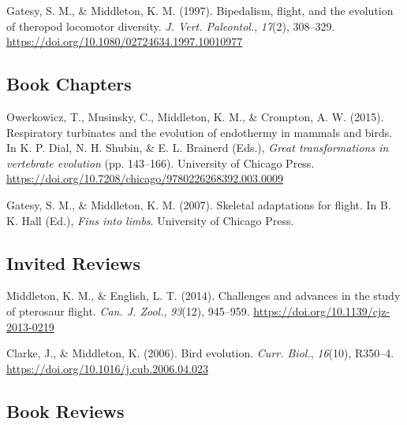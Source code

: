 \documentclass[11pt, a4paper]{awesome-cv}
\begin{document}
\leavevmode\hypertarget{ref-gatesy_bipedalism_1997}{}%
Gatesy, S. M., \& Middleton, K. M. (1997). Bipedalism, flight, and the
evolution of theropod locomotor diversity. \emph{J. Vert. Paleontol.},
\emph{17}(2), 308--329.
\url{https://doi.org/10.1080/02724634.1997.10010977}

\endgroup

\hypertarget{book-chapters}{%
\subsection{Book Chapters}\label{book-chapters}}

\begingroup
\setlength{\parindent}{-0.5in}
\setlength{\leftskip}{0.5in}

\hypertarget{refs_bookchapters}{}
\leavevmode\hypertarget{ref-owerkowicz_respiratory_2015}{}%
Owerkowicz, T., Musinsky, C., Middleton, K. M., \& Crompton, A. W.
(2015). Respiratory turbinates and the evolution of endothermy in
mammals and birds. In K. P. Dial, N. H. Shubin, \& E. L. Brainerd
(Eds.), \emph{Great transformations in vertebrate evolution} (pp.
143--166). University of Chicago Press.
\url{https://doi.org/10.7208/chicago/9780226268392.003.0009}

\leavevmode\hypertarget{ref-gatesy_skeletal_2007}{}%
Gatesy, S. M., \& Middleton, K. M. (2007). Skeletal adaptations for
flight. In B. K. Hall (Ed.), \emph{Fins into limbs}. University of
Chicago Press.

\endgroup

\hypertarget{invited-reviews}{%
\subsection{Invited Reviews}\label{invited-reviews}}

\begingroup
\setlength{\parindent}{-0.5in}
\setlength{\leftskip}{0.5in}

\hypertarget{refs_reviews}{}
\leavevmode\hypertarget{ref-middleton_challenges_2015}{}%
Middleton, K. M., \& English, L. T. (2014). Challenges and advances in
the study of pterosaur flight. \emph{Can. J. Zool.}, \emph{93}(12),
945--959. \url{https://doi.org/10.1139/cjz-2013-0219}

\leavevmode\hypertarget{ref-clarke_bird_2006}{}%
Clarke, J., \& Middleton, K. (2006). Bird evolution. \emph{Curr. Biol.},
\emph{16}(10), R350--4. \url{https://doi.org/10.1016/j.cub.2006.04.023}

\endgroup

\hypertarget{book-reviews}{%
\subsection{Book Reviews}\label{book-reviews}}
\end{document}
